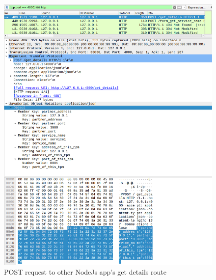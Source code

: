 \begin{figure}[!h]
  \centering
      \includegraphics[width=1\textwidth]{Figures/b8.png}
  \caption[POST request to other NodeJs app's get details route]{POST request to other NodeJs app's get details route}
  \label{fig:b8}
\end{figure}
\FloatBarrier


